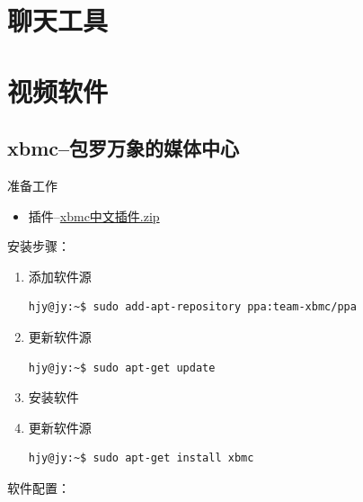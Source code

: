 \clearpage
\section{聊天工具}
\section{视频软件}
\subsection{xbmc--包罗万象的媒体中心}
准备工作
\begin{itemize}
\item 插件--\href{}{xbmc中文插件.zip}
\end{itemize}

安装步骤：
\begin{enumerate}
\item 添加软件源
\begin{lstlisting}[style=BASH]
hjy@jy:~$ sudo add-apt-repository ppa:team-xbmc/ppa
\end{lstlisting}

\item 更新软件源
\begin{lstlisting}[style=BASH]
hjy@jy:~$ sudo apt-get update
\end{lstlisting}

\item 安装软件
\item 更新软件源
\begin{lstlisting}[style=BASH]
hjy@jy:~$ sudo apt-get install xbmc
\end{lstlisting}
\end{enumerate}
软件配置：
